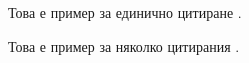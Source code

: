 \documentclass[a4paper,12pt]{article}
\begin{document}
Това е пример за единично цитиране \cite{example1}.

Това е пример за няколко цитирания
\cite{example2,example3,example4,example5,example6}.

\printbibliography
\end{document}
